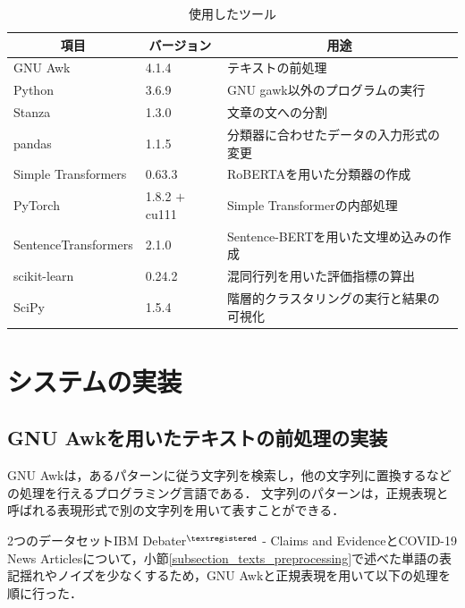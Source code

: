 \documentclass[12pt,a4j]{jreport}
\begin{document}

\begin{table}[H]
  \caption{使用したツール}
  \centering
  \vspace{4mm}
  \begin{tabular}{lll}
    \hline
    \multicolumn{1}{c}{項目} & \multicolumn{1}{c}{バージョン} & \multicolumn{1}{c}{用途} \\
    \hline
    GNU Awk & 4.1.4 & テキストの前処理 \\
    Python & 3.6.9 & GNU gawk以外のプログラムの実行 \\
    Stanza & 1.3.0 & 文章の文への分割 \\
    pandas & 1.1.5 & 分類器に合わせたデータの入力形式の変更 \\
    Simple Transformers & 0.63.3 & RoBERTAを用いた分類器の作成 \\
    PyTorch & 1.8.2 $+$ cu111 & Simple Transformerの内部処理 \\
    SentenceTransformers & 2.1.0 & Sentence-BERTを用いた文埋め込みの作成 \\
    scikit-learn & 0.24.2 & 混同行列を用いた評価指標の算出 \\
    SciPy & 1.5.4 & 階層的クラスタリングの実行と結果の可視化 \\
    \hline
    \end{tabular}
  \label{module_version}
\end{table}


\section{システムの実装}

\subsection{GNU Awkを用いたテキストの前処理の実装}
\label{subsection_data_preprocessing_implement}
GNU Awkは，あるパターンに従う文字列を検索し，他の文字列に置換するなどの処理を行えるプログラミング言語である．
文字列のパターンは，正規表現と呼ばれる表現形式で別の文字列を用いて表すことができる．

2つのデータセットIBM Debater$^{\textregistered}$ - Claims and EvidenceとCOVID-19 News Articlesについて，小節\ref{subsection_texts_preprocessing}で述べた単語の表記揺れやノイズを少なくするため，GNU Awkと正規表現を用いて以下の処理を順に行った．
\end{document}
